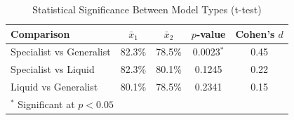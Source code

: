 \begin{table}[htbp]
\centering
\caption{Statistical Significance Between Model Types (t-test)}
\label{tab:significance}
\begin{tabular}{lcccc}
\toprule
\textbf{Comparison} & \textbf{$\bar{x}_1$} & \textbf{$\bar{x}_2$} & \textbf{$p$-value} & \textbf{Cohen's $d$} \\
\midrule
Specialist vs Generalist & 82.3\% & 78.5\% & 0.0023$^{*}$ & 0.45 \\
Specialist vs Liquid & 82.3\% & 80.1\% & 0.1245 & 0.22 \\
Liquid vs Generalist & 80.1\% & 78.5\% & 0.2341 & 0.15 \\
\bottomrule
\multicolumn{5}{l}{\footnotesize $^{*}$ Significant at $p < 0.05$} \\
\end{tabular}
\end{table}